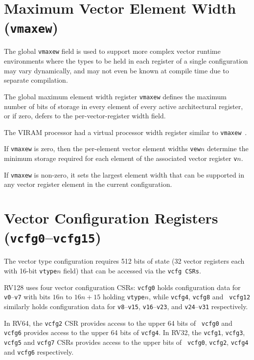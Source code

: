 \clearpage

\section{Maximum Vector Element Width ({\tt vmaxew})}

The global {\tt vmaxew} field is used to support more complex vector
runtime environments where the types to be held in each register of a
single configuration may vary dynamically, and may not even be known
at compile time due to separate compilation.

The global maximum element width register {\tt vmaxew} defines the
maximum number of bits of storage in every element of every active
architectural register, or if zero, defers to the per-vector-register
width field.

\begin{commentary}
  The VIRAM processor had a virtual processor width
  register similar to {\tt vmaxew}~\cite{VIRAM}.
\end{commentary}

If {\tt vmaxew} is zero, then the per-element vector element widths
{\tt vew}$n$ determine the minimum storage required for each element
of the associated vector register {\tt v}$n$.

If {\tt vmaxew} is non-zero, it sets the largest element width that
can be supported in any vector register element in the current
configuration.

\clearpage

\section{Vector Configuration Registers ({\tt vcfg0}--{\tt vcfg15})}

The vector type configuration requires 512 bits of state (32 vector
registers each with 16-bit {\tt vtype}$n$ field) that can be accessed
via the {\tt vcfg CSRs}.

RV128 uses four vector configuration CSRs: {\tt vcfg0} holds
configuration data for {\tt v0}--{\tt v7} with bits $16n$ to $16n+15$
holding {\tt vtype}$n$, while {\tt vcfg4}, {\tt vcfg8} and {\tt
  vcfg12} similarly holds configuration data for {\tt v8}--{\tt v15},
  {\tt v16}--{\tt v23}, and {\tt v24}--{\tt v31} respectively.

In RV64, the {\tt vcfg2} CSR provides access to the upper 64 bits of {\tt
  vcfg0} and {\tt vcfg6} provides access to the upper 64 bits of
{\tt vcfg4}.  In RV32, the {\tt vcfg1}, {\tt vcfg3}, {\tt vcfg5}
and {\tt vcfg7} CSRs provides access to the upper bits of {\tt
  vcfg0}, {\tt vcfg2}, {\tt vcfg4} and {\tt vcfg6} respectively.

